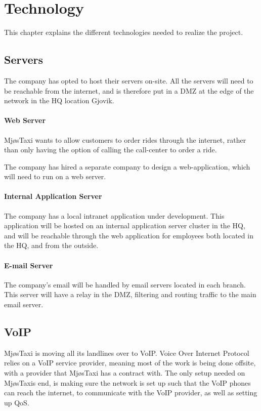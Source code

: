 \chapter{Technology} %
\label{chap:technology}


This chapter explains the different technologies needed to realize the project.

\section{Servers}
The company has opted to host their servers on-site.
All the servers will need to be reachable from the internet, and is therefore put in a DMZ at the edge of the network in the HQ location Gjovik.

\subsubsection{Web Server}
MjøsTaxi wants to allow customers to order rides through the internet, rather than only having the option of calling the call-center to order a ride.

The company has hired a separate company to design a web-application, which will need to run on a web server.

\subsubsection{Internal Application Server}
The company has a local intranet application under development. This application will be hosted on an internal application server cluster in the HQ, and will be reachable through the web application for employees both located in the HQ, and from the outside. %

\subsubsection{E-mail Server}
The company's email will be handled by email servers located in each branch.
This server will have a relay in the DMZ, filtering and routing traffic to the main email server.



\section{VoIP}
MjøsTaxi is moving all its landlines over to VoIP.
Voice Over Internet Protocol relies on a VoIP service provider, meaning most of the work is being done offsite, with a provider that MjøsTaxi has a contract with. \cite{VoIP} 
The only setup needed on MjøsTaxis end, is making sure the network is set up such that the VoIP phones can reach the internet, to communicate with the VoIP provider, as well as setting up QoS.

